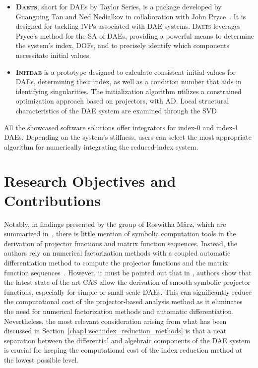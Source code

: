 \begin{itemize}
  \item \textbf{\textsc{Daets}}, short for \acp{DAE} by Taylor Series, is a \cpp{} package developed by Guangning Tan and Ned Nedialkov in collaboration with John Pryce~\cite{nedialkov2007solvingI, nedialkov2007solvingII, nedialkov2008solvingIII}. It is designed for tackling \acp{IVP} associated with \ac{DAE} systems. \textsc{Daets} leverages Pryce's method for the \ac{SA} of \acp{DAE}, providing a powerful means to determine the system's index, \acp{DOF}, and to precisely identify which components necessitate initial values.
  \item \textbf{\textsc{Initdae}} is a \Python{} prototype designed to calculate consistent initial values for \acp{DAE}, determining their index, as well as a condition number that aids in identifying singularities. The initialization algorithm utilizes a constrained optimization approach based on projectors, with \ac{AD}. Local structural characteristics of the \ac{DAE} system are examined through the \ac{SVD}~\cite{estvezschwarz2021initdae}
\end{itemize}
%
All the showcased software solutions offer integrators for index-0 and index-1 \acp{DAE}. Depending on the system's stiffness, users can select the most appropriate algorithm for numerically integrating the reduced-index system.


\section{Research Objectives and Contributions}

Notably, in findings presented by the group of Roswitha M{\"a}rz, which are summarized in~\cite{lamour2013differential}, there is little mention of symbolic computation tools in the derivation of projector functions and matrix function sequences. Instead, the authors rely on numerical factorization methods with a coupled automatic differentiation method to compute the projector functions and the matrix function sequences~\cite{lamour2011computational, schwarz2015diagnosis}. However, it must be pointed out that in \citet{lamour2013differential}, authors show that the latest state-of-the-art \ac{CAS} allow the derivation of smooth symbolic projector functions, especially for simple or small-scale \acp{DAE}. This can significantly reduce the computational cost of the projector-based analysis method as it eliminates the need for numerical factorization methods and automatic differentiation. Nevertheless, the most relevant consideration arising from what has been discussed in Section~\ref{chap1:sec:index_reduction_methods} is that a neat separation between the differential and algebraic components of the \ac{DAE} system is crucial for keeping the computational cost of the index reduction method at the lowest possible level.

